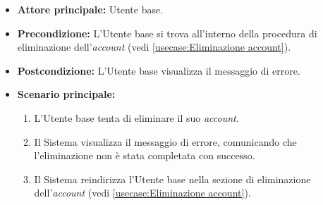 \label{usecase:Errore eliminazione account}
\begin{itemize}
	\item \textbf{Attore principale:} Utente base.

	\item \textbf{Precondizione:}
	      L'Utente base si trova all'interno della procedura di eliminazione dell'\textit{account} (vedi \autoref{usecase:Eliminazione account}).

	\item \textbf{Postcondizione:}
	      L'Utente base visualizza il messaggio di errore.

	\item \textbf{Scenario principale:}
	      \begin{enumerate}
		      \item L'Utente base tenta di eliminare il suo \textit{account}.
		      \item Il Sistema visualizza il messaggio di errore, comunicando che l'eliminazione non è stata completata con successo.
		      \item Il Sistema reindirizza l'Utente base nella sezione di eliminazione dell'\textit{account} (vedi \autoref{usecase:Eliminazione account}).
	      \end{enumerate}
\end{itemize}

